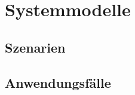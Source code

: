 \chapter{Systemmodelle}
\label{ch:sysmodel}

\section{Szenarien}

\section{Anwendungsfälle}
\begin{figure}[ht]
\end{figure}
